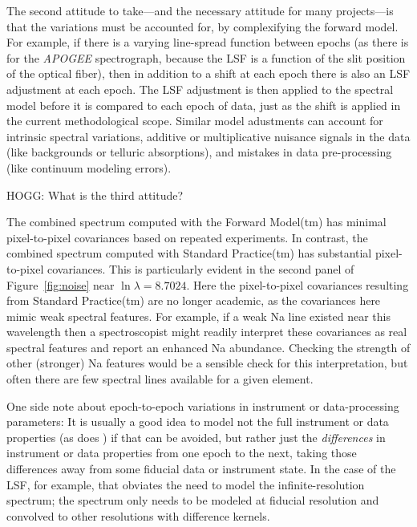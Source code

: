 \documentclass[modern]{aastex631}
\begin{document}
The second attitude to take---and the necessary attitude for many projects---is that the variations must be accounted for, by complexifying the forward model.
For example, if there is a varying line-spread function between epochs (as there is for the \textsl{APOGEE} spectrograph, because the LSF is a function of the slit position of the optical fiber), then in addition to a shift at each epoch there is also an LSF adjustment at each epoch.
The LSF adjustment is then applied to the spectral model before it is compared to each epoch of data, just as the shift is applied in the current methodological scope.
Similar model adustments can account for intrinsic spectral variations, additive or multiplicative nuisance signals in the data (like backgrounds or telluric absorptions), and mistakes in data pre-processing (like continuum modeling errors).

HOGG: What is the third attitude?

The combined spectrum computed with the Forward Model(tm) has minimal pixel-to-pixel covariances based on repeated experiments.
In contrast, the combined spectrum computed with Standard Practice(tm) has substantial pixel-to-pixel covariances.
This is particularly evident in the second panel of Figure~\ref{fig:noise} near $\ln\lambda = 8.7024$.
Here the pixel-to-pixel covariances resulting from Standard Practice(tm) are no longer academic, as the covariances here mimic weak spectral features.
For example, if a weak Na line existed near this wavelength then a spectroscopist might readily interpret these covariances as real spectral features and report an enhanced Na abundance.
Checking the strength of other (stronger) Na features would be a sensible check for this interpretation, but often there are few spectral lines available for a given element.

One side note about epoch-to-epoch variations in instrument or data-processing parameters:
It is usually a good idea to model not the full instrument or data properties (as does \citealt{sp}) if that can be avoided, but rather just the \emph{differences} in instrument or data properties from one epoch to the next, taking those differences away from some fiducial data or instrument state.
In the case of the LSF, for example, that obviates the need to model the infinite-resolution spectrum; the spectrum only needs to be modeled at fiducial resolution and convolved to other resolutions with difference kernels.
\end{document}
